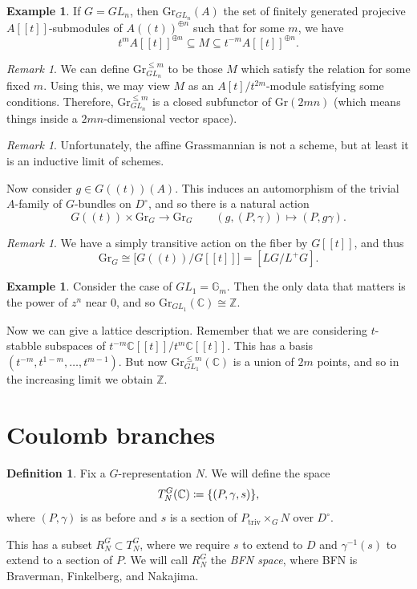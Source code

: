 \documentclass[leqno, openany]{memoir}
\theoremstyle{definition}
\newtheorem{defn}[thm]{Definition}
\newtheorem{exm}[thm]{Example}
\theoremstyle{remark}
\newtheorem{rmk}[thm]{Remark}
\theoremstyle{plain}
\theoremstyle{definition}
\theoremstyle{remark}
\newcommand{\C}{\mathbb{C}}
\newcommand{\Z}{\mathbb{Z}}
\newcommand{\mr}[1]{\mathrm{#1}}
\newcommand{\1}{\mathbf{1}}
\newcommand{\2}{\mathbf{2}}
\newcommand{\3}{\mathbf{3}}
\begin{document}
\begin{exm}
    If $G = GL_n$, then $\mr{Gr}_{GL_n}(A)$ the set of finitely generated projecive $A[[t]]$-submodules of $A((t))^{\oplus n}$ such that for some $m$, we have
    \[ t^m A[[t]]^{\oplus n} \subseteq M \subseteq t^{-m} A[[t]]^{\oplus n}. \]
\end{exm}

\begin{rmk}
    We can define $\mr{Gr}_{GL_n}^{\leq m}$ to be those $M$ which satisfy the relation for some fixed $m$. Using this, we may view $M$ as an $A[t] / t^{2m}$-module satisfying some conditions. Therefore, $\mr{Gr}_{GL_n}^{\leq m}$ is a closed subfunctor of $\mr{Gr}(2mn)$ (which means things inside a $2mn$-dimensional vector space).
\end{rmk}

\begin{rmk}
    Unfortunately, the affine Grassmannian is not a scheme, but at least it is an inductive limit of schemes.
\end{rmk}

Now consider $g \in G((t))(A)$. This induces an automorphism of the trivial $A$-family of $G$-bundles on $D^{\circ}$, and so there is a natural action 
\[ G((t)) \times \mr{Gr}_G \to \mr{Gr}_G \qquad (g, (P, \gamma)) \mapsto (P, g \gamma). \]
\begin{rmk}
    We have a simply transitive action on the fiber by $G[[t]]$, and thus
    \[ \mr{Gr}_G \cong \big[G((t))/  G[[t]]\big] = [LG / L^+G]. \]
\end{rmk}

\begin{exm}
    Consider the case of $GL_1 = \mathbb{G}_m$. Then the only data that matters is the power of $z^n$ near $0$, and so $\mr{Gr}_{GL_1}(\C) \cong \Z$.
\end{exm}

Now we can give a lattice description. Remember that we are considering $t$-stabble subspaces of $t^{-m} \C[[t]] / t^m \C[[t]]$. This has a basis $(t^{-m}, t^{1-m}, \ldots, t^{m-1})$. But now $\mr{Gr}_{GL_1}^{\leq m}(\C)$ is a union of $2m$ points, and so in the increasing limit we obtain $\Z$.

\section{Coulomb branches}%
\label{sec:coulomb_branches}

\begin{defn}
    Fix a $G$-representation $N$. We will define the space 
    \[ T_N^G(\C) \coloneqq \qty{(P, \gamma, s)}, \]
    where $(P, \gamma)$ is as before and $s$ is a section of $P_{\mr{triv}} \times_G N$ over $D^{\circ}$.

    This has a subset $R_N^G \subset T_N^G$, where we require $s$ to extend to $D$ and $\gamma^{-1}(s)$ to extend to a section of $P$. We will call $R_N^G$ the \textit{BFN space}, where BFN is Braverman, Finkelberg, and Nakajima.
\end{defn}
\end{document}
